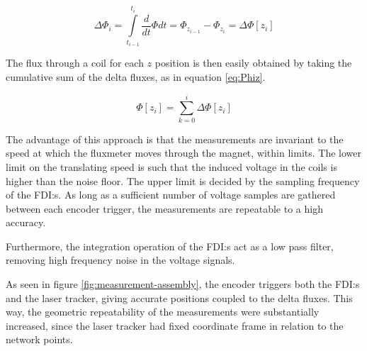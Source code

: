 \begin{equation}
    \Delta \Phi_i =
    \int \limits_{t_{i-1}}^{t_i} \frac{d}{dt}\Phi dt
    = \Phi_{z_{i-1}} - \Phi_{z_{i}} = \Delta \Phi[z_i]
    \label{eq:deltaPhi}
\end{equation}

The flux through a coil for each $z$ position is then easily obtained
by taking the cumulative sum of the delta fluxes, as in equation
\ref{eq:Phiz}.

\begin{equation}
    \Phi[z_i] = \sum \limits_{k=0}^i \Delta \Phi[z_i]
    \label{eq:Phiz}
\end{equation}

The advantage of this approach is that the measurements are invariant
to the speed at which the fluxmeter moves through the magnet, within limits.
The lower limit on the translating speed is such that the induced
voltage in the coils is higher than the noise floor.
The upper limit is decided by the sampling frequency of the FDI:s.
As long as a sufficient number of voltage samples are gathered between
each encoder trigger, the measurements are repeatable to a high accuracy.

Furthermore, the integration operation of the FDI:s act as a
low pass filter, removing high frequency noise in the voltage
signals.

As seen in figure \ref{fig:measurement-assembly}, the encoder triggers
both the FDI:s and the laser tracker, giving accurate positions coupled
to the delta fluxes. This way, the geometric repeatability of the 
measurements were substantially increased, since the laser tracker 
had fixed coordinate frame in relation to the network points.


